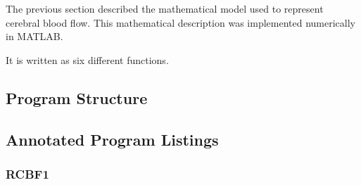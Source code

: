 The previous section described the mathematical model used to
represent cerebral blood flow.  This mathematical description was
implemented numerically in MATLAB.

It is written as six different functions.


\subsection{Program Structure}

\subsection{Annotated Program Listings}

\subsubsection{RCBF1}

